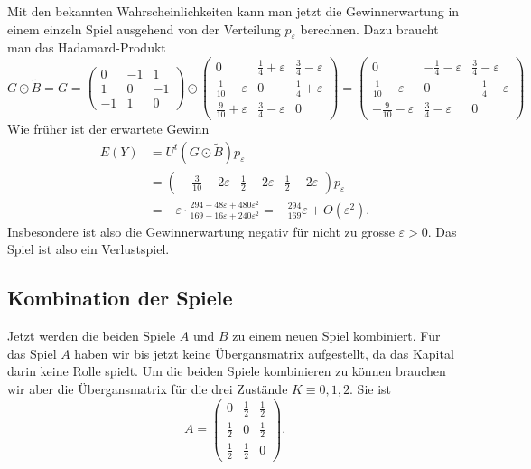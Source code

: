 Mit den bekannten Wahrscheinlichkeiten kann man jetzt die
Gewinnerwartung in einem einzeln Spiel ausgehend von der Verteilung
$p_{\varepsilon}$ berechnen.
Dazu braucht man das Hadamard-Produkt
\[
G\odot \tilde{B}
=
G=\begin{pmatrix}
 0&-1& 1\\
 1& 0&-1\\
-1& 1& 0
\end{pmatrix}
\odot
\begin{pmatrix}
0                        &\frac14+\varepsilon & \frac34-\varepsilon \\
\frac{1}{10}-\varepsilon & 0                  & \frac14+\varepsilon \\
\frac{9}{10}+\varepsilon &\frac34-\varepsilon & 0
\end{pmatrix}
=
\begin{pmatrix}
 0                        &-\frac14-\varepsilon & \frac34-\varepsilon \\
 \frac{1}{10}-\varepsilon & 0                   &-\frac14-\varepsilon \\
-\frac{9}{10}-\varepsilon & \frac34-\varepsilon & 0
\end{pmatrix}
\]
Wie früher ist der erwartete Gewinn
\begin{align*}
E(Y)
&=
U^t (G\odot \tilde{B}) p_{\varepsilon}
\\
&=
\begin{pmatrix}
-\frac{3}{10}-2\varepsilon & \frac12-2\varepsilon & \frac12-2\varepsilon
\end{pmatrix}
p_{\varepsilon}
\\
&=
-
\varepsilon\cdot
\frac{
294-48\varepsilon+480\varepsilon^2
}{
169-16\varepsilon+240\varepsilon^2
}
=
-\frac{294}{169}\varepsilon + O(\varepsilon^2).
\end{align*}
Insbesondere ist also die Gewinnerwartung negativ für nicht zu grosse 
$\varepsilon>0$.
Das Spiel ist also ein Verlustspiel.

%
%
\subsection{Kombination der Spiele
\label{buch:subsection:kombination}}
Jetzt werden die beiden Spiele $A$ und $B$ zu einem neuen
Spiel kombiniert.
Für das Spiel $A$ haben wir bis jetzt keine Übergansmatrix aufgestellt,
da das Kapital darin keine Rolle spielt.
Um die beiden Spiele kombinieren zu können brauchen wir aber die Übergansmatrix
für die drei Zustände $K\equiv 0,1,2$.
Sie ist
\[
A=\begin{pmatrix}
0&\frac12&\frac12\\
\frac12&0&\frac12\\
\frac12&\frac12&0
\end{pmatrix}.
\]

